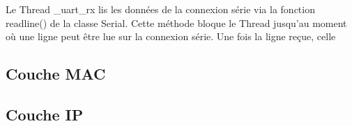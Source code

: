     Le Thread \_uart\_rx lis les données de la connexion série via la fonction readline() de la classe Serial. Cette méthode bloque le Thread jusqu'au moment où une ligne peut être lue sur la connexion série. Une fois la ligne reçue, celle 







\subsection*{Couche MAC}

\subsection*{Couche IP}\label{subsec:work-loraroot:iplayer}